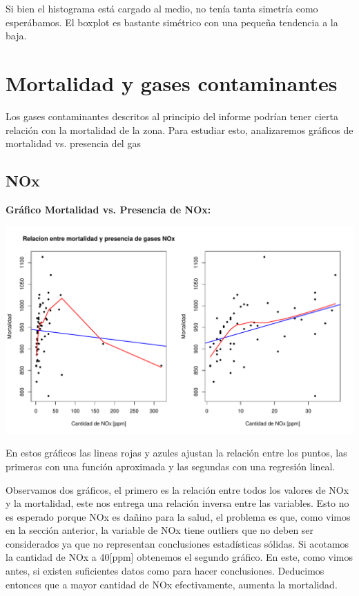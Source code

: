 \documentclass[11pt]{article}
\begin{document}
Si bien el histograma está cargado al medio, no tenía tanta simetría como esperábamos. El boxplot es bastante simétrico con una pequeña tendencia a la baja.

\section{Mortalidad y gases contaminantes}

Los gases contaminantes descritos al principio del informe podrían tener cierta relación con la mortalidad de la zona. Para estudiar esto, analizaremos gráficos de mortalidad vs.  presencia del gas 

\subsection{NOx}

\textbf{Gráfico Mortalidad vs. Presencia de NOx:}

\begin{center}
    \includegraphics[scale = 0.4]{mortnox}
\end{center}

En estos gráficos las lineas rojas y azules ajustan la relación entre los puntos, las primeras con una función aproximada y las segundas con una regresión lineal.

Observamos dos gráficos, el primero es la relación entre todos los valores de NOx y la mortalidad, este nos entrega una relación inversa entre las variables. Esto no es esperado porque NOx es dañino para la salud, el problema es que, como vimos en la sección anterior, la variable de NOx tiene outliers que no deben ser considerados ya que no representan conclusiones estadísticas sólidas. Si acotamos la cantidad de NOx a 40[ppm] obtenemos el segundo gráfico. En este, como vimos antes, si existen suficientes datos como para hacer conclusiones. Deducimos entonces que a mayor cantidad de NOx efectivamente, aumenta la mortalidad.
\end{document}
